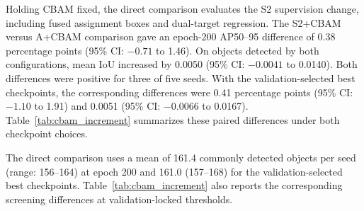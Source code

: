 \documentclass[energies,article,submit,pdftex,moreauthors]{Definitions/mdpi}
\begin{document}
Holding CBAM fixed, the direct comparison evaluates the S2 supervision change, including fused assignment boxes and dual-target regression. The S2+CBAM versus A+CBAM comparison gave an epoch-200 AP50--95 difference of 0.38 percentage points (95\% CI: $-0.71$ to 1.46). On objects detected by both configurations, mean IoU increased by 0.0050 (95\% CI: $-0.0041$ to 0.0140). Both differences were positive for three of five seeds. With the validation-selected best checkpoints, the corresponding differences were 0.41 percentage points (95\% CI: $-1.10$ to 1.91) and 0.0051 (95\% CI: $-0.0066$ to 0.0167). Table~\ref{tab:cbam_increment} summarizes these paired differences under both checkpoint choices.

The direct comparison uses a mean of 161.4 commonly detected objects per seed (range: 156--164) at epoch 200 and 161.0 (157--168) for the validation-selected best checkpoints. Table~\ref{tab:cbam_increment} also reports the corresponding screening differences at validation-locked thresholds.
\end{document}
